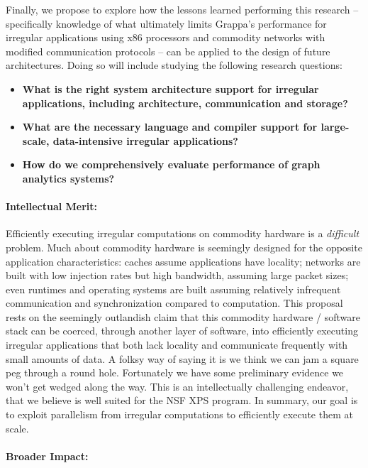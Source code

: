 Finally, we propose to explore how the lessons learned performing this research -- specifically knowledge of what ultimately limits Grappa's performance for irregular applications using x86 processors and commodity networks with modified communication protocols -- can be applied to the design of future architectures.  Doing so will include studying the following research questions:

\begin{itemize}
\item \textbf{What is the right system architecture support for irregular applications, including architecture, communication and storage?}
\item \textbf{What are the necessary language and compiler support for large-scale, data-intensive irregular applications?}
\item \textbf{How do we comprehensively evaluate performance of graph analytics systems?}
\end{itemize}


\paragraph{Intellectual Merit:}

Efficiently executing irregular computations on commodity hardware is a
\emph{difficult} problem. Much about commodity hardware is seemingly designed
for the opposite application characteristics: caches assume applications have
locality; networks are built with low injection rates but high bandwidth,
assuming large packet sizes; even runtimes and operating systems are built
assuming relatively infrequent communication and synchronization compared to
computation. This proposal rests on the seemingly outlandish claim that this
commodity hardware / software stack can be coerced, through another layer of
software, into efficiently executing irregular applications that both lack
locality and communicate frequently with small amounts of data. A folksy way
of saying it is we think we can jam a square peg through a round hole.
Fortunately we have some preliminary evidence we won't get wedged along the
way. This is an intellectually challenging endeavor, that we believe is well
suited for the NSF XPS program. In summary, our goal is to exploit parallelism
from irregular computations to efficiently execute them at scale.

\paragraph{Broader Impact:}

